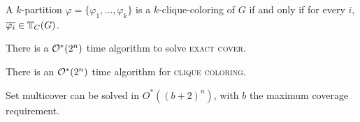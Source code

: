 \begin{lemma}
    \label{lem:clique_transversal_colorings}
    A $k$-partition $\varphi = \{\varphi_1, \dots, \varphi_k\}$ is a $k$-clique-coloring of $G$ if and only if for every $i$, $\overline{\varphi_i} \in \mathbb{T}_{C}(G)$.
\end{lemma}


\begin{theorem}
    \label{thm:inc_exc}
    There is a $\mathcal{O}^*\!\left(2^n\right)$ time algorithm to solve \textsc{exact cover}.
\end{theorem}

\begin{theorem}
    \label{thm:clique_color_algorithm}
    There is an $\mathcal{O}^*\!\left(2^n\right)$ time algorithm for \textsc{clique coloring}.
\end{theorem}



\begin{theorem}
    \label{thm:set_multicover}
    Set multicover can be solved in $O^*((b+2)^n)$, with $b$ the maximum coverage requirement.
\end{theorem}